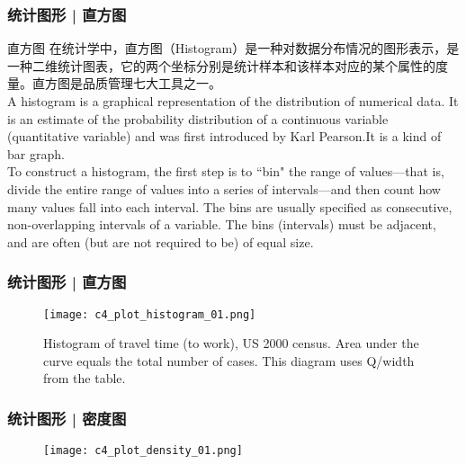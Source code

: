 \begin{frame}
  \frametitle{统计图形 | 直方图}
  \begin{block}{直方图}
在统计学中，直方图（Histogram）是一种对数据分布情况的图形表示，是一种二维统计图表，它的两个坐标分别是统计样本和该样本对应的某个属性的度量。直方图是品质管理七大工具之一。\\
    \vspace{0.5em}
    A histogram is a graphical representation of the distribution of numerical data. It is an estimate of the probability distribution of a continuous variable (quantitative variable) and was first introduced by Karl Pearson.It is a kind of bar graph.\\
    \vspace{0.5em}
    To construct a histogram, the first step is to ``bin" the range of values—that is, divide the entire range of values into a series of intervals—and then count how many values fall into each interval. The bins are usually specified as consecutive, non-overlapping intervals of a variable. The bins (intervals) must be adjacent, and are often (but are not required to be) of equal size.
  \end{block}
\end{frame}

\begin{frame}
  \frametitle{统计图形 | 直方图}
  \begin{figure}
    \centering
    \texttt{[image: c4\_plot\_histogram\_01.png]}
    \caption{Histogram of travel time (to work), US 2000 census. Area under the curve equals the total number of cases. This diagram uses Q/width from the table.}
  \end{figure}
\end{frame}

\begin{frame}
  \frametitle{统计图形 | 密度图}
  \begin{figure}
    \centering
    \texttt{[image: c4\_plot\_density\_01.png]}
  \end{figure}
\end{frame}

